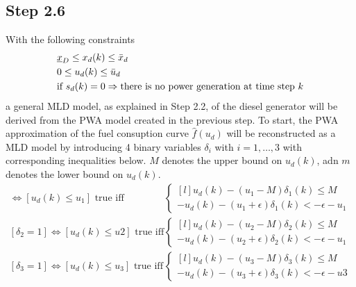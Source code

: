 \subsection*{Step 2.6}
With the following constraints
\begin{align*}
& \underline{x}_D \leq x_d(k) \leq \Bar{x}_d \\
& 0 \leq u_d(k) \leq \Bar{u}_d \\
& \text{if } s_d(k) = 0 \Rightarrow \text{there is no power generation at time step } k 
\end{align*}
a general MLD model, as explained in Step 2.2, of the diesel generator will be derived from the PWA model created in the previous step.
To start, the PWA approximation of the fuel consuption curve $\hat{f}(u_d)$ will be reconstructed as a MLD model by introducing 4 binary variables $\delta_i$ with $i = 1,\dots,3$ with corresponding inequalities below. $M$ denotes the upper bound on $u_d(k)$, adn $m$ denotes the lower bound on $u_d(k)$.
\begin{align*}
[\delta_1 = 1] \Leftrightarrow [u_d(k) \leq u_1] \text{ true iff}
&\left\{\begin{matrix*}[l]
    u_d(k) - (u_1 - M)\delta_1(k) \leq M \\
    -u_d(k) - (u_1 + \epsilon)\delta_1(k) < -\epsilon - u_1
\end{matrix*}\right. \\
[\delta_2 = 1] \Leftrightarrow [u_d(k) \leq u2] \text{ true iff}
&\left\{\begin{matrix*}[l]
    u_d(k) - (u_2 - M)\delta_2(k) \leq M \\
    -u_d(k) - (u_2 + \epsilon)\delta_2(k) < -\epsilon - u_1
\end{matrix*}\right. \\
[\delta_3 = 1] \Leftrightarrow [u_d(k) \leq u_3] \text{ true iff}
&\left\{\begin{matrix*}[l]
    u_d(k) - (u_3 - M)\delta_3(k) \leq M \\
    -u_d(k) - (u_3 + \epsilon)\delta_3(k) < -\epsilon - u3
\end{matrix*}\right. \\
\end{align*}
